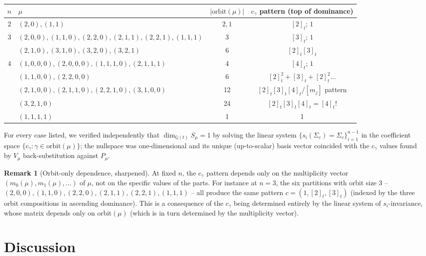 \documentclass[11pt]{article}
\theoremstyle{definition}
\newtheorem{remark}[theorem]{Remark}
\newcommand{\orbit}{\mathrm{orbit}}
\newcommand{\QQ}{\mathbb{Q}}
\begin{document}
\begin{center}
\begin{tabular}{|c|l|c|c|}
\hline
$n$ & $\mu$ & $|\orbit(\mu)|$ & $c_\gamma$ pattern (top of dominance) \\
\hline
$2$ & $(2,0), (1,1)$ & $2,1$ & $[2]_t$; \; $1$ \\
\hline
$3$ & $(2,0,0), (1,1,0), (2,2,0), (2,1,1), (2,2,1), (1,1,1)$ & 3 & $[3]_t$; \; $1$ \\
    & $(2,1,0), (3,1,0), (3,2,0), (3,2,1)$ & 6 & $[2]_t[3]_t$ \\
\hline
$4$ & $(1,0,0,0), (2,0,0,0), (1,1,1,0), (2,1,1,1)$ & 4 & $[4]_t$; \; $1$ \\
    & $(1,1,0,0), (2,2,0,0)$ & 6 & $[2]_t^2 + [3]_t + [2]_t^2$... \\
    & $(2,1,0,0), (2,1,1,0), (2,2,1,0), (3,1,0,0)$ & 12 & $[2]_t[3]_t[4]_t/[m_j]$ pattern \\
    & $(3,2,1,0)$ & 24 & $[2]_t[3]_t[4]_t = [4]_t!$ \\
    & $(1,1,1,1)$ & 1 & 1 \\
\hline
\end{tabular}
\end{center}

For every case listed, we verified independently that
$\dim_{\QQ(t)} S_\mu = 1$ by solving the linear system
$\{s_i(\Sigma_c) = \Sigma_c\}_{i=1}^{n-1}$ in the coefficient space
$\{c_\gamma : \gamma\in\orbit(\mu)\}$; the nullspace was one-dimensional
and its unique (up-to-scalar) basis vector coincided with the $c_\gamma$
values found by $V_\mu$ back-substitution against $P_\mu$.

\begin{remark}[Orbit-only dependence, sharpened]
At fixed $n$, the $c_\gamma$ pattern depends only on the multiplicity
vector $(m_0(\mu), m_1(\mu), \ldots)$ of $\mu$, not on the specific
values of the parts.  For instance at $n=3$, the six partitions with
orbit size $3$ -- $(2,0,0), (1,1,0), (2,2,0), (2,1,1), (2,2,1), (1,1,1)$
-- all produce the same pattern $c=(1, [2]_t, [3]_t)$ (indexed by the
three orbit compositions in ascending dominance).  This is a consequence
of the $c_\gamma$ being determined entirely by the linear system of
$s_i$-invariance, whose matrix depends only on $\orbit(\mu)$ (which is
in turn determined by the multiplicity vector).
\end{remark}

\section{Discussion}\label{sec:discussion}
\end{document}
